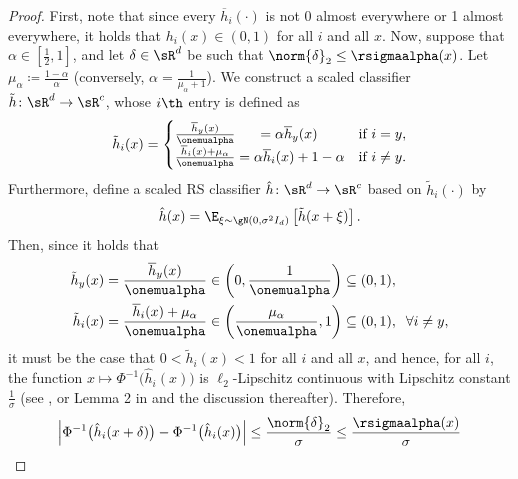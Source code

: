 \documentclass[11pt, letterpaper]{article}
\theoremstyle{plain}
\theoremstyle{definition}
\begin{document}
\begin{proof}
	First, note that since every $\overline{h}_i (\cdot)$ is not 0 almost everywhere or 1 almost everywhere, it holds that $h_i (x) \in (0, 1)$ for all $i$ and all $x$. Now, suppose that $\alpha \in [\frac{1}{2}, 1]$, and let $\delta\in \sR^d$ be such that $\norm{\delta}_2 \le \rsigmaalpha (x)$. Let $\mu_\alpha \coloneqq \frac{1-\alpha}{\alpha}$ (conversely, $\alpha = \frac{1} {\mu_\alpha+1}$). We construct a scaled classifier $\tilde{h} \colon \sR^d \to \sR^c$, whose $i\th$ entry is defined as
	\begin{equation*}
		\tilde{h}_i (x) = \begin{aligned}
			\begin{cases}
				\frac{\overline{h}_y (x)} {\onemualpha} \hspace{5.3mm} = \alpha \overline{h}_y(x) & \text{if $i = y$}, \\
				\frac{\overline{h}_i (x) + \mu_\alpha} {\onemualpha} = \alpha \overline{h}_i (x) + 1 - \alpha & \text{if $i \ne y$}.
			\end{cases}
			\end{aligned}
	\end{equation*}
	Furthermore, define a scaled RS classifier $\hat{h} \colon \sR^d \to \sR^c$ based on $\tilde{h}_i (\cdot)$ by 
	\begin{equation*}
		\hat{h} (x) = \E_{\xi \sim \gN (0, \sigma^2 I_d)} \left[ \tilde{h} (x+\xi) \right].
	\end{equation*}
	Then, since it holds that
	\begin{align*}
		\tilde{h}_y(x) &= \frac{\overline{h}_y (x)} {\onemualpha} \in \left( 0, \frac{1}{\onemualpha} \right) \subseteq (0, 1), \\
		\tilde{h}_i(x) &= \frac{\overline{h}_i (x) + \mu_\alpha} {\onemualpha} \in \left( \frac{\mu_\alpha} {\onemualpha}, 1 \right) \subseteq (0, 1), \;\; \forall i \neq y,
	\end{align*}
	it must be the case that $0 < \tilde{h}_i (x) < 1$ for all $i$ and all $x$, and hence, for all $i$, the function $x \mapsto \Phi^{-1} \big( \hat{h}_i(x) \big)$ is $\ell_2$-Lipschitz continuous with Lipschitz constant $\frac{1}{\sigma}$ (see \cite[Lemma~1]{Levine19}, or Lemma 2 in \cite{Salman19} and the discussion thereafter). Therefore,
	\begin{equation}
		\left| \Phi^{-1} \big( \hat{h}_i (x+\delta) \big) - \Phi^{-1} \big( \hat{h}_i (x) \big) \right| \le \frac{\norm{\delta}_2} {\sigma} \le \frac{\rsigmaalpha (x)}{\sigma} \label{eq:lipschitz_inequality}

\end{equation}
\end{proof}
\end{document}
